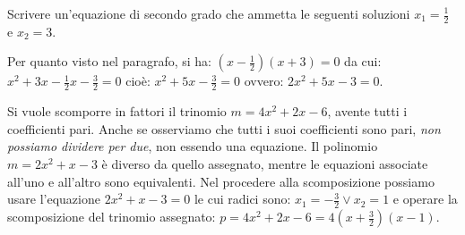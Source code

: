 \begin{esempio}
Scrivere un'equazione di secondo grado che ammetta le seguenti soluzioni \(x_{1} 
= \frac{1}{2}\) e \(x_{2} = 3\).

Per quanto visto nel paragrafo, si ha: \(\left(x-\frac{1}{2} \right) \left(x + 3 
\right)=0\) da cui: \(x^{2} + 3 x-\frac{1}{2} x - \frac{3}{2}=0\) cioè: \(x^{2} + 5 
x - \frac{3}{2}=0\) ovvero: \(2 x^{2} + 5 x-3=0\).
\end{esempio}

\osservazione
Si vuole scomporre in fattori il trinomio \(m = 4 x^{2} + 2 x - 6\), avente tutti 
i coefficienti pari. Anche se osserviamo che tutti i suoi coefficienti sono 
pari, \emph{non possiamo dividere per due}, non essendo una equazione. Il 
polinomio \(m = 2 x^{2} + x - 3\) è diverso da quello assegnato, mentre le 
equazioni associate all'uno e all'altro sono equivalenti. Nel procedere alla 
scomposizione possiamo usare l'equazione \(2 x^{2} + x - 3 = 0\) le cui radici 
sono:
\(x_{1} = - \frac{3}{2} \vee x_{2} = 1\) e operare la scomposizione del trinomio 
assegnato: \(p = 4 x^{2} + 2 x - 6 = 4 \left( x + \frac{3}{2} \right) ( x - 1)\).

